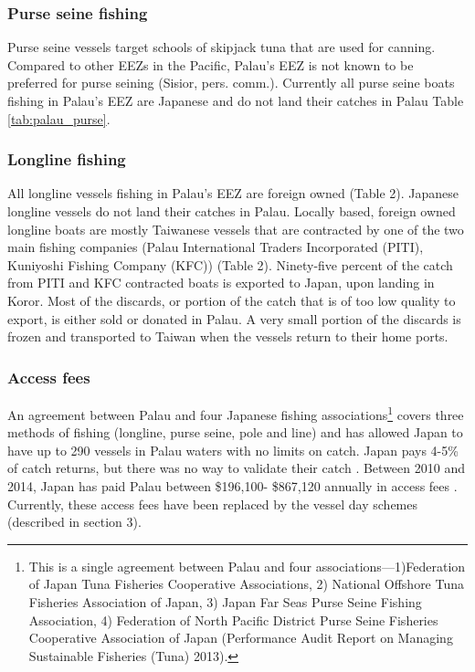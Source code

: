 \documentclass[11pt,english]{article}
\begin{document}
\subsubsection{Purse seine fishing}

Purse seine vessels target schools of skipjack tuna that are used for canning. Compared to other EEZs in the Pacific, Palau’s EEZ is not known to be preferred for purse seining (Sisior, pers. comm.). Currently all purse seine boats fishing in Palau’s EEZ are Japanese and do not land their catches in Palau Table \ref{tab:palau_purse}. 

%

\subsubsection{Longline fishing}

All longline vessels fishing in Palau’s EEZ are foreign owned (Table 2). Japanese longline vessels do not land their catches in Palau. Locally based, foreign owned longline boats are mostly Taiwanese vessels that are contracted by one of the two main fishing companies (Palau International Traders Incorporated (PITI), Kuniyoshi Fishing Company (KFC)) (Table 2). Ninety-five percent of the catch from PITI and KFC contracted boats is exported to Japan, upon landing in Koror. Most of the discards, or portion of the catch that is of too low quality to export, is either sold or donated in Palau. A very small portion of the discards is frozen and transported to Taiwan when the vessels return to their home ports.

%


\subsubsection{Access fees}

An agreement between Palau and four Japanese fishing associations\footnote{This is a single agreement between Palau and four associations—1)Federation of Japan Tuna Fisheries Cooperative Associations, 2) National Offshore Tuna Fisheries Association of Japan, 3) Japan Far Seas Purse Seine Fishing Association, 4) Federation of North Pacific District Purse Seine Fisheries Cooperative Association of Japan (Performance Audit Report on Managing Sustainable Fisheries (Tuna) 2013).} covers three methods of fishing (longline, purse seine, pole and line) and has allowed Japan to have up to 290 vessels in Palau waters with no limits on catch. Japan pays 4-5\% of catch returns, but there was no way to validate their catch \citep{Tewid2013}. Between 2010 and 2014, Japan has paid Palau between \$196,100- \$867,120 annually in access fees \citep{Gillett2016}. Currently, these access fees have been replaced by the vessel day schemes (described in section 3).
\end{document}
